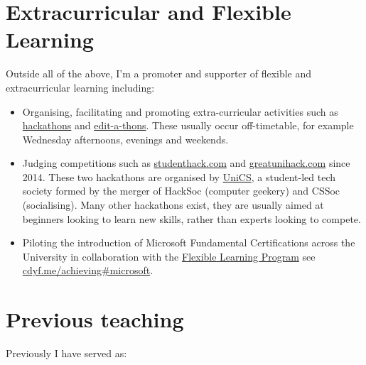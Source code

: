 \documentclass[
  12pt,
]{book}
\providecommand{\tightlist}{%
  \setlength{\itemsep}{0pt}\setlength{\parskip}{0pt}}
\begin{document}
\section{Extracurricular and Flexible Learning}\label{extra}

Outside all of the above, I'm a promoter and supporter of flexible and extracurricular learning including:

\begin{itemize}
\tightlist
\item
  Organising, facilitating and promoting extra-curricular activities such as \href{https://en.wikipedia.org/wiki/Hackathon}{hackathons} \citep{Briscoe, Warner2017} and \href{https://en.wikipedia.org/wiki/Edit-a-thon}{edit-a-thons}. \citep{goodbadugly, troubled, findingada2019} These usually occur off-timetable, for example Wednesday afternoons, evenings and weekends.
\item
  Judging competitions such as \href{https://www.studenthack.com}{studenthack.com} and \href{https://greatunihack.com}{greatunihack.com} since 2014. These two hackathons are organised by \href{https://www.unicsmcr.com/}{UniCS}, a student-led tech society formed by the merger of HackSoc (computer geekery) and CSSoc (socialising). Many other hackathons exist, they are usually aimed at beginners looking to learn new skills, rather than experts looking to compete. \citep{Briscoe, hafb}
\item
  Piloting the introduction of Microsoft Fundamental Certifications across the University in collaboration with the \href{https://www.manchester.ac.uk/discover/teaching-and-learning-excellence/flexible-learning/}{Flexible Learning Program} see \href{https://www.cdyf.me/achieving\#microsoft}{cdyf.me/achieving\#microsoft}. \citep{georgepettifer}
\end{itemize}

\section{Previous teaching}\label{previously}

Previously I have served as:
\end{document}

